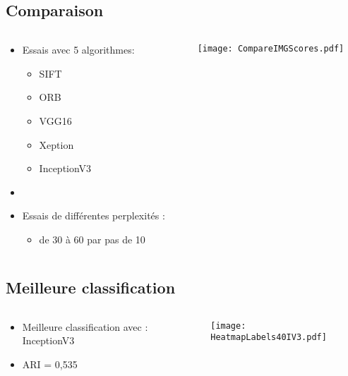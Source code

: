 \documentclass[8pt,aspectratio=169,hyperref={unicode=true}]{beamer}
\begin{document}
\subsection{Comparaison}
\begin{frame}{\insertsubsection}
    \begin{columns}
        \begin{column}{.4\textwidth}
            \begin{itemize}
                \item Essais avec 5 algorithmes:
                      \begin{itemize}
                          \item SIFT
                          \item ORB
                          \item VGG16
                          \item Xeption
                          \item InceptionV3
                      \end{itemize}
                \item[]
                \item Essais de différentes perplexités :
                      \begin{itemize}
                          \item de 30 à 60 par pas de 10
                      \end{itemize}
            \end{itemize}
        \end{column}
        \begin{column}{.6\textwidth}
            \texttt{[image: CompareIMGScores.pdf]}
        \end{column}
    \end{columns}
\end{frame}

\subsection{Meilleure classification}
\begin{frame}{\insertsubsection}
    \begin{columns}
        \begin{column}{.4\textwidth}
            \begin{itemize}
                \item Meilleure classification avec : InceptionV3
                \item ARI = 0,535
            \end{itemize}
        \end{column}
        \begin{column}{.6\textwidth}
            \texttt{[image: HeatmapLabels40IV3.pdf]}
        \end{column}
    \end{columns}
\end{frame}
\end{document}
